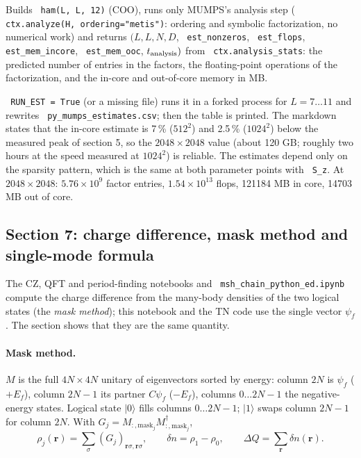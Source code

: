 \documentclass[11pt]{article}
\renewenvironment{function}[1]{\par\Needspace{7\baselineskip}\medskip\noindent{\raggedright\textbf{\large\texttt{\hyphenchar\font=-1 #1}}\par}\nopagebreak}{\par\medskip}
\renewcommand{\code}[1]{\texttt{\hyphenchar\font=-1 #1}}
\newcommand{\ket}[1]{|#1\rangle}
\begin{document}
\begin{function}{mumps\_estimate(L)}
Builds \code{ham(L, L, 12)} (COO), runs only MUMPS's analysis step (\code{ctx.analyze(H, ordering="metis")}: ordering and symbolic
factorization, no numerical work) and returns
$(L, L, N, D$, \code{est\_nonzeros}, \code{est\_flops}, \code{est\_mem\_incore}, \code{est\_mem\_ooc}, $t_{\rm analysis})$ from
\code{ctx.analysis\_stats}: the predicted number of entries in the factors, the floating-point operations of the factorization, and the
in-core and out-of-core memory in MB.
\end{function}
\code{RUN\_EST = True} (or a missing file) runs it in a forked process for $L = 7\dots11$ and rewrites \code{py\_mumps\_estimates.csv}; then the
table is printed. The markdown states that the in-core estimate is 7\,\% ($512^2$) and 2.5\,\% ($1024^2$) below the measured peak of section 5,
so the $2048\times2048$ value (about 120 GB; roughly two hours at the speed measured at $1024^2$) is reliable. The estimates depend only on
the sparsity pattern, which is the same at both parameter points with \code{S\_z}. At $2048\times2048$: $5.76\times10^9$ factor entries, $1.54\times10^{13}$ flops, 121184 MB in core, 14703 MB out of core.

\subsection{Section 7: charge difference, mask method and single-mode formula}

The CZ, QFT and period-finding notebooks and \code{msh\_chain\_python\_ed.ipynb} compute the charge difference from the many-body densities of
the two logical states (the \emph{mask method}); this notebook and the TN code use the single vector $\psi_f$. The section shows that they are
the same quantity.

\paragraph{Mask method.} $M$ is the full $4N\times4N$ unitary of eigenvectors sorted by energy: column $2N$ is $\psi_f$ ($+E_f$), column $2N-1$ its
partner $C\psi_f$ ($-E_f$), columns $0\dots2N-1$ the negative-energy states. Logical state $\ket0$ fills columns $0\dots2N-1$; $\ket1$ swaps column
$2N-1$ for column $2N$. With $G_j = M_{:,\text{mask}_j}M_{:,\text{mask}_j}^\dagger$,
\[
\rho_j(\mathbf r) = \sum_\sigma(G_j)_{\mathbf r\sigma,\mathbf r\sigma},\qquad \delta n = \rho_1-\rho_0,\qquad \Delta Q = \sum_{\mathbf r}\delta n(\mathbf r).
\]
\end{document}
